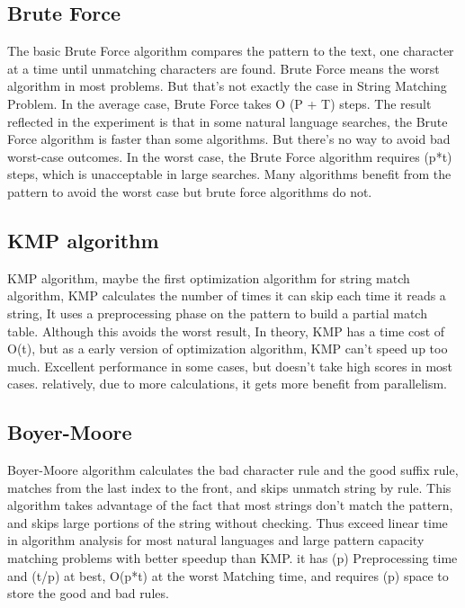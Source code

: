 \documentclass[11pt]{article}       %
\begin{document}
\subsection{Brute Force}\label{bf}
The basic Brute Force algorithm compares the pattern to the text, one character at a time until unmatching characters are found. Brute Force means the worst algorithm in most problems. But that's not exactly the case in String Matching Problem. In the average case, Brute Force takes O (P + T) steps. The result reflected in the experiment is that in some natural language searches, the Brute Force algorithm is faster than some algorithms. But there's no way to avoid bad worst-case outcomes. In the worst case, the Brute Force algorithm requires (p*t) steps, which is unacceptable in large searches. Many algorithms benefit from the pattern to avoid the worst case but brute force algorithms do not.

\subsection{KMP algorithm}\label{kmp}
KMP algorithm, maybe the first optimization algorithm\cite{KMP} for string match algorithm, KMP calculates the number of times it can skip each time it reads a string, It uses a preprocessing phase on the pattern to build a partial match table. Although this avoids the worst result, In theory, KMP has a time cost of O(t), but as a early version of optimization algorithm, KMP can’t speed up too much. Excellent performance in some cases, but doesn’t take high scores in most cases. relatively, due to more calculations, it gets more benefit from parallelism.

\subsection{Boyer-Moore}\label{bm}
Boyer-Moore algorithm calculates the bad character rule and the good suffix rule\cite{BM}, matches from the last index to the front, and skips unmatch string by rule. This algorithm takes advantage of the fact that most strings don’t match the pattern, and skips large portions of the string without checking. Thus exceed linear time in algorithm analysis for most natural languages and large pattern capacity matching problems with better speedup than KMP. it has (p) Preprocessing time and  (t/p) at best, O(p*t) at the worst Matching time, and requires (p) space to store the good and bad rules.
\end{document}
